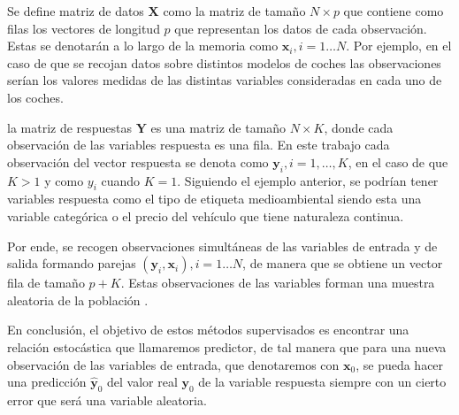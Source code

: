 \begin{defi}
Se define matriz de datos $\textbf{X}$ como la matriz de tamaño $N\times p$ que contiene como filas los vectores de longitud $p$ que representan los datos de cada observación. Estas se denotarán a lo largo de la memoria como $\textbf{x}_i, i=1\ldots N$. Por ejemplo, en el caso de que se recojan datos sobre distintos modelos de coches las observaciones serían los valores medidas de las distintas variables consideradas en cada uno de los coches. 
\end{defi}

\begin{defi}
la matriz de respuestas $\textbf{Y}$ es una matriz de tamaño $N \times K$, donde cada observación de las variables respuesta es una fila. En este trabajo cada observación del vector respuesta se denota como $\mathbf{y}_i, i=1,\ldots, K$, en el caso de que $K>1$ y como $y_i$ cuando $K=1$. Siguiendo el ejemplo anterior, se podrían tener variables respuesta como el tipo de etiqueta medioambiental siendo esta una variable categórica o el precio del vehículo que tiene naturaleza continua.
\end{defi}

\noindent Por ende, se recogen observaciones simultáneas de las variables de entrada y de salida formando parejas $(\mathbf{y}_i,\textbf{x}_i), i=1\ldots N$, de manera que se obtiene un vector fila de tamaño $p+K$. Estas observaciones de las variables forman una muestra aleatoria de la población .


\noindent En conclusión, el objetivo de estos métodos supervisados es encontrar una relación estocástica que llamaremos predictor, de tal manera que para una nueva observación de las variables de entrada, que denotaremos con $\textbf{x}_0$, se pueda hacer una predicción $\hat{\textbf{y}}_0$ del valor real $\textbf{y}_0$ de la variable respuesta siempre con un cierto error que será una variable  aleatoria. 
 
